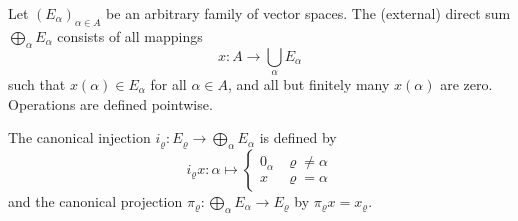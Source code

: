 Let $(E_\alpha)_{\alpha \in A}$ be an arbitrary family of vector spaces. The (external) direct sum $\bigoplus_\alpha E_\alpha$ consists of all mappings
$$x: A \to \bigcup_\alpha E_\alpha$$
such that $x(\alpha) \in E_\alpha$ for all $\alpha \in A$, and all but finitely many $x(\alpha)$ are zero. Operations are defined pointwise.

The canonical injection $i_\varrho: E_\varrho \to \bigoplus_\alpha E_\alpha$ is defined by
$$i_\varrho x: \alpha \mapsto \begin{cases} 0_\alpha & \varrho \neq \alpha \\ x & \varrho = \alpha \end{cases}$$
and the canonical projection $\pi_\varrho: \bigoplus_\alpha E_\alpha \to E_\varrho$ by $\pi_\varrho x = x_\varrho$.
